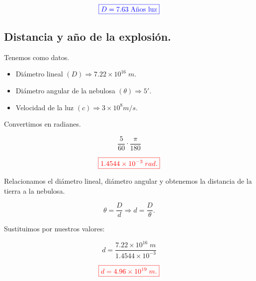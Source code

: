 \documentclass[a4paper,12pt]{article} %
\begin{document}
\vspace{\baselineskip}

\[ \textcolor{blue}{\boxed{D = 7.63 \; \text{Años luz}}}\]

\vspace{\baselineskip}

\subsection{Distancia y año  de la explosión.}

\vspace{\baselineskip}

\begin{justify}
    Tenemos como datos.
\end{justify}

\begin{itemize}
    \item Diámetro lineal \((D) \Rightarrow 7.22 \times 10^{16} \; m \).
    \item Diámetro angular de la nebulosa \((\theta) \Rightarrow 5'. \) 
    \item Velocidad de la luz \((c) \Rightarrow 3 \times 10^8 m/s. \)
\end{itemize}

\begin{justify}
    Convertimos en radianes.
\end{justify}

\[ \frac{5}{60} \cdot \frac{\pi}{180}\]

\[ \textcolor{red}{\boxed{1.4544 \times 10^{-3} \; rad. }}\]

\vspace{\baselineskip}

\begin{justify}
    Relacionamos el diámetro lineal, diámetro angular y obtenemos la distancia de la tierra a la nebulosa.
\end{justify}

\[ \theta = \frac{D}{d} \Rightarrow d = \frac{D}{\theta}. \]

\begin{justify}
    Sustituimos por nuestros valores:
\end{justify}


\[ d = \frac{7.22 \times 10^{16} \; m}{1.4544 \times 10^{-3}} \]

\vspace{\baselineskip}

\[ \textcolor{red}{\boxed{ d = 4.96 \times 10^{19} \; m. }} \]
\end{document}
